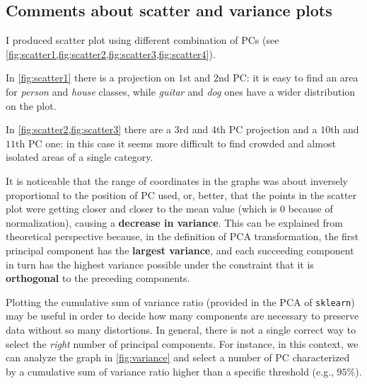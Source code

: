 \documentclass[a4paper, 11pt]{article}
\begin{document}
	\subsection{Comments about scatter and variance plots}
	I produced scatter plot using different combination of PCs (see \vref{fig:scatter1,fig:scatter2,fig:scatter3,fig:scatter4}).
	
	In \cref{fig:scatter1} there is a projection on $1$st and $2$nd PC: it is easy to find an area for \textit{person} and \textit{house} classes, while \textit{guitar} and \textit{dog} ones have a wider distribution on the plot.
	
	In \cref{fig:scatter2,fig:scatter3} there are a $3$rd and $4$th PC projection and a $10$th and $11$th PC one: in this case it seems more difficult to find crowded and almost isolated areas of a single category.
	
	It is noticeable that the range of coordinates in the graphs was about inversely proportional to the position of PC used, or, better, that the points in the scatter plot were getting closer and closer to the mean value (which is $0$ because of normalization), causing a \textbf{decrease in variance}. This can be explained from theoretical perspective because, in the definition of PCA transformation, the first principal component has the \textbf{largest variance}, and each succeeding component in turn has the highest variance possible under the constraint that it is \textbf{orthogonal} to the preceding components.
	
	Plotting the cumulative sum of variance ratio (provided in the PCA of \texttt{sklearn}) may be useful in order to decide how many components are necessary to preserve data without so many distortions. In general, there is not a single correct way to select the \textit{right} number of principal  components. For instance, in this context, we can analyze the graph in \vref{fig:variance} and select a number of PC characterized by a cumulative sum of variance ratio higher than a specific threshold (e.g., $95\%$).
	
\end{document}
